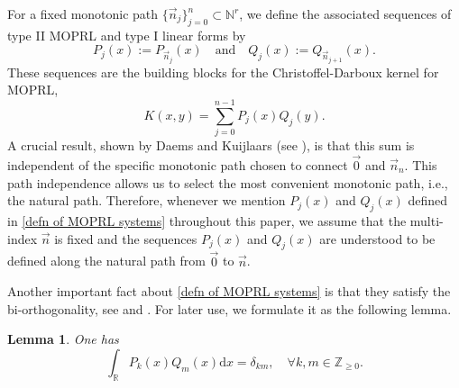 \documentclass[a4paper,10pt,leqno]{amsart}
\numberwithin{equation}{section}
\newtheorem{lemma}[theorem]{Lemma}
\theoremstyle{remark}
\newcommand{\dd}{\mathrm{d}}
\newcommand{\R}{\mathbb{R}}
\newcommand{\N}{\mathbb{N}}
\begin{document}
For a fixed monotonic path $\{\vec{n}_j\}_{j=0}^n \subset \N^r$, we define the associated sequences of type II MOPRL and type I linear forms by
\begin{equation} \label{defn of MOPRL systems}
	P_j(x) := P_{\vec{n}_j}(x) \quad \text{and} \quad Q_j(x) := Q_{\vec{n}_{j+1}}(x).
\end{equation}
These sequences are the building blocks for the Christoffel-Darboux kernel for MOPRL,
\begin{equation}\label{defn of CD kernel}
	K(x,y) = \sum_{j=0}^{n-1} P_j(x)Q_j(y).
\end{equation}
A crucial result, shown by Daems and Kuijlaars (see \cite[Theorem 1.1, Remark 1.2]{DaemsKuijlaars2004}), is that this sum is independent of the specific monotonic path chosen to connect $\vec{0}$ and $\vec{n}_n$.
This path independence allows us to select the most convenient monotonic path, i.e., the natural path.
Therefore, whenever we mention $P_j(x)$ and $Q_j(x)$ defined in \eqref{defn of MOPRL systems} throughout this paper, we assume that the multi-index $\vec{n}$ is fixed and the sequences $P_j(x)$ and $Q_j(x)$ are understood to be defined along the natural path from $\vec 0$ to $\vec n$.



Another important fact about \eqref{defn of MOPRL systems} is that they satisfy the bi-orthogonality, see \cite[Lemma 3.1]{DaemsKuijlaars2004} and \cite[Theorem 23.1.6]{Ismail}. For later use, we formulate it as the following lemma.

\begin{lemma} \label{biorthogonality}
One has
\begin{equation}\label{biorth MOPRL}
	\int_{\R} P_k(x) Q_m(x) \dd x = \delta_{km}, \quad \forall k,m \in \mathbb{Z}_{\geq 0}.
\end{equation}
\end{lemma}
\end{document}
